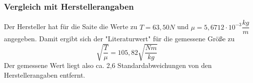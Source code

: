 \documentclass[12pt,a4paper]{article}
\begin{document}
\subsubsection{Vergleich mit Herstellerangaben}
Der Hersteller hat für die Saite die Werte zu $T = 63,50N$ und $\mu = 5,6712 \cdot 10^{-3} \dfrac{kg}{m}$ angegeben. Damit ergibt sich der "Literaturwert" für die gemessene Größe zu 
\begin{equation}
\sqrt{\dfrac{T}{\mu}} = 105,82 \sqrt{\dfrac{Nm}{kg}}
\end{equation}
Der gemessene Wert liegt also ca. 2,6 Standardabweichungen von den Herstellerangaben entfernt.
\end{document}
